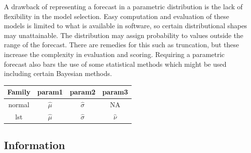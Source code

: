 \documentclass{article}\usepackage[]{graphicx}\usepackage[]{color}
\begin{document}
A drawback of representing a forecast in a parametric distribution is the lack 
of flexibility in the model selection. Easy computation and evaluation of these 
models is limited to what is available in software, so certain distributional
shapes may unattainable. The distribution may assign probability to values
outside the range of the forecast. There are remedies for this such as 
truncation, but these increase the complexity in evaluation and scoring.
Requiring a parametric forecast also bars the use of some statistical methods
which might be used including certain Bayesian methods.

\begin{table}[h!]
\centering
 \begin{tabular}{||c c c c||} 
 \hline
 Family & param1 & param2 & param3 \\ [0.5ex] 
 \hline\hline
 normal & $\hat{\mu}$ & $\hat{\sigma}$ & NA \\ 
 lst & $\hat{\mu}$ & $\hat{\sigma}$ & $\hat{\nu}$ \\ [1ex] 
 \hline
 \end{tabular}
\end{table}

 



\subsection*{Information}
	 

	 

\newpage    


\end{document}
